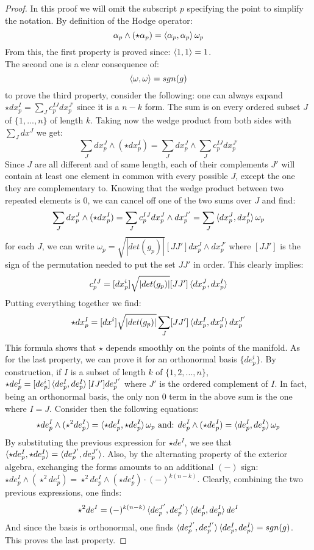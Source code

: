 \documentclass[12pt,a4paper]{report}
\theoremstyle{definition}
\theoremstyle{Theorem}
\theoremstyle{definition}
\theoremstyle{definition}
\begin{document}
	\begin{proof}
		In this proof we will omit the subscript $p$ specifying the point to simplify the notation. 
		By definition of the Hodge operator:
		$$\alpha_p\wedge(\star\alpha_p)=\braket{\alpha_p,\alpha_p}\omega_p$$
		From this, the first property is proved since: $\braket{1,1}=1$.\\
		The second one is a clear consequence of:
		$$\braket{\omega,\omega}=sgn(g)$$
		to prove the third property, consider the following: one can always expand $\star dx^I_p=\sum_Jc_p^{IJ}dx_p^{J'}$ since it is a $n-k$ form. The sum is on every ordered subset $J$ of $\{1,...,n\}$ of length $k$. Taking now the wedge product from both sides with $\sum_J dx^J$ we get:
		$$\sum_Jdx_p^J\wedge(\star dx_p^I)=\sum_Jdx_p^J\wedge\sum_Jc_p^{IJ}dx_p^{J'}$$
		Since $J$ are all different and of same length, each of their complements $J'$ will contain at least one element in common with every possible $J$, except the one they are complementary to. Knowing that the wedge product between two repeated elements is 0, we can cancel off one of the two sums over $J$ and find:
		$$\sum_Jdx_p^J\wedge(\star dx_p^I)=\sum_Jc_p^{IJ}dx_p^J\wedge dx_p^{J'}=\sum_J\braket{dx_p^J,dx_p^I}\omega_p$$
		for each $J$, we can write $\omega_p=\sqrt{|det(g_p)|}[JJ']dx_p^J\wedge dx_p^{J'}$ where $[JJ']$ is the sign of the permutation needed to put the set $JJ'$ in order. This clearly implies:
		$$c_p^{IJ}=[dx_p^i]\sqrt{|det(g_p)|}[JJ']\braket{dx_p^J,dx_p^I}$$
		Putting everything together we find:
		$$\star dx_p^I=[dx^i]\sqrt{|det(g_p)|}\sum_J[JJ']\braket{dx_p^I,dx_p^J}dx_p^{J'}$$
		This formula shows that $\star$ depends smoothly on the points of the manifold.
		As for the last property, we can prove it for an orthonormal basis $\{de_p^i\}$. By construction, if $I$ is a subset of length $k$ of $\{1,2,...,n\}$, $\star de_p^I=[de_p^i]\braket{de_p^I,de_p^I}[IJ'] de_p^{J'}$ where $J'$ is the ordered complement of $I$. In fact, being an orthonormal basis, the only non 0 term in the above sum is the one where $I=J$. Consider then the following equations:
		$$\star de_p^I\wedge (\star^2 de_p^I)=\braket{\star de_p^I,\star de_p^I}\omega_p\hbox{ and: } de_p^I\wedge (\star de_p^I)=\braket{de_p^I,de_p^I}\omega_p$$
		By substituting the previous expression for $\star de^I$, we see that $\braket{\star de_p^I,\star de_p^I}=\braket{de_p^{J'}, de_p^{J'}}$. Also, by the alternating property of the exterior algebra, exchanging the forms amounts to an additional $(-)$ sign: $\star de_p^I\wedge (\star^2 de_p^I)=\star^2 de_p^I\wedge (\star de_p^I)\cdot (-)^{k(n-k)}$. Clearly, combining the two previous expressions, one finds:
		$$\star^2 de^I=(-)^{k(n-k)}\braket{de_p^{J'}, de_p^{J'}}\braket{de_p^{I}, de_p^{I}}de^I$$
		And since the basis is orthonormal, one finds $\braket{de_p^{J'}, de_p^{J'}}\braket{de_p^{I}, de_p^{I}}=sgn(g)$. This proves the last property.
	\end{proof}
\end{document}
